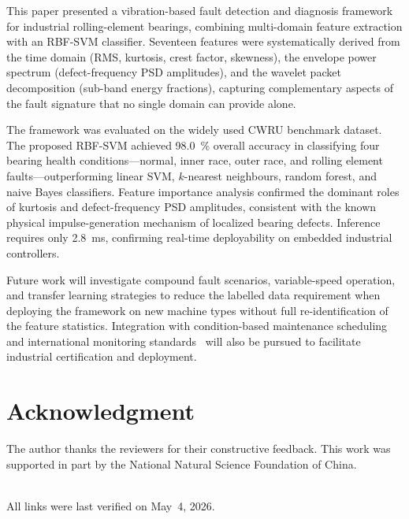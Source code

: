 \documentclass[conference,a4paper]{IEEEtran}[2015/08/26]
\begin{document}
This paper presented a vibration-based fault detection and diagnosis
framework for industrial rolling-element bearings, combining multi-domain
feature extraction with an RBF-SVM classifier. Seventeen features were
systematically derived from the time domain (RMS, kurtosis, crest factor,
skewness), the envelope power spectrum (defect-frequency PSD amplitudes),
and the wavelet packet decomposition (sub-band energy fractions),
capturing complementary aspects of the fault signature that no single
domain can provide alone.

The framework was evaluated on the widely used CWRU benchmark dataset.
The proposed RBF-SVM achieved \SI{98.0}{\percent} overall accuracy in
classifying four bearing health conditions---normal, inner race,
outer race, and rolling element faults---outperforming linear SVM,
$k$-nearest neighbours, random forest, and naive Bayes classifiers.
Feature importance analysis confirmed the dominant roles of kurtosis
and defect-frequency PSD amplitudes, consistent with the known physical
impulse-generation mechanism of localized bearing defects. Inference
requires only \SI{2.8}{\milli\second}, confirming real-time deployability
on embedded industrial controllers.

Future work will investigate compound fault scenarios, variable-speed
operation, and transfer learning strategies to reduce the labelled data
requirement when deploying the framework on new machine types without
full re-identification of the feature statistics. Integration with
condition-based maintenance scheduling~\cite{Jardine2006} and
international monitoring standards~\cite{ISO13373} will also be
pursued to facilitate industrial certification and deployment.

\section*{Acknowledgment}

The author thanks the reviewers for their constructive feedback.
This work was supported in part by the National Natural Science
Foundation of China.


\clearpage



\ \\
\noindent All links were last verified on May~4, 2026.
\end{document}
